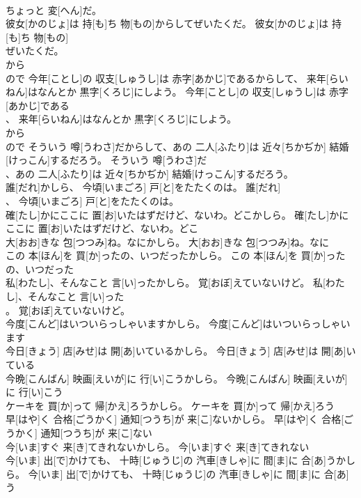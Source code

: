 \documentclass[8pt]{extreport}
\begin{document}
\begin{CJK}{UTF8}{min}
\\	ちょっと 変[へん]だ。	
\\	彼女[かのじょ]は 持[も]ち 物[もの]からしてぜいたくだ。	彼女[かのじょ]は 持[も]ち 物[もの]
\\	ぜいたくだ。	
\\	から 
\\	ので	今年[ことし]の 収支[しゅうし]は 赤字[あかじ]であるからして、 来年[らいねん]はなんとか 黒字[くろじ]にしよう。	今年[ことし]の 収支[しゅうし]は 赤字[あかじ]である
\\	、 来年[らいねん]はなんとか 黒字[くろじ]にしよう。	
\\	から 
\\	ので	そういう 噂[うわさ]だからして、あの 二人[ふたり]は 近々[ちかぢか] 結婚[けっこん]するだろう。	そういう 噂[うわさ]だ
\\	、あの 二人[ふたり]は 近々[ちかぢか] 結婚[けっこん]するだろう。	
\\	誰[だれ]かしら、 今頃[いまごろ] 戸[と]をたたくのは。	誰[だれ]
\\	、 今頃[いまごろ] 戸[と]をたたくのは。	
\\	確[たし]かにここに 置[お]いたはずだけど、ないわ。どこかしら。	確[たし]かにここに 置[お]いたはずだけど、ないわ。どこ
\\	大[おお]きな 包[つつみ]ね。なにかしら。	大[おお]きな 包[つつみ]ね。なに
\\	この 本[ほん]を 買[か]ったの、いつだったかしら。	この 本[ほん]を 買[か]ったの、いつだった
\\	私[わたし]、そんなこと 言[い]ったかしら。 覚[おぼ]えていないけど。	私[わたし]、そんなこと 言[い]った
\\	。 覚[おぼ]えていないけど。	
\\	今度[こんど]はいついらっしゃいますかしら。	今度[こんど]はいついらっしゃいます
\\	今日[きょう] 店[みせ]は 開[あ]いているかしら。	今日[きょう] 店[みせ]は 開[あ]いている
\\	今晩[こんばん] 映画[えいが]に 行[い]こうかしら。	今晩[こんばん] 映画[えいが]に 行[い]こう
\\	ケーキを 買[か]って 帰[かえ]ろうかしら。	ケーキを 買[か]って 帰[かえ]ろう
\\	早[はや]く 合格[ごうかく] 通知[つうち]が 来[こ]ないかしら。	早[はや]く 合格[ごうかく] 通知[つうち]が 来[こ]ない
\\	今[いま]すぐ 来[き]てきれないかしら。	今[いま]すぐ 来[き]てきれない
\\	今[いま] 出[で]かけても、 十時[じゅうじ]の 汽車[きしゃ]に 間[ま]に 合[あ]うかしら。	今[いま] 出[で]かけても、 十時[じゅうじ]の 汽車[きしゃ]に 間[ま]に 合[あ]う

\end{CJK}
\end{document}
